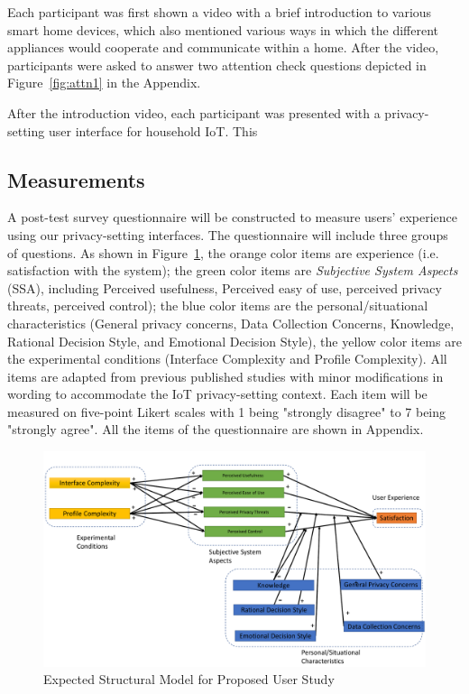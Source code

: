 Each participant was first shown a video with a brief introduction to various smart home devices, which also mentioned various ways in which the different appliances would cooperate and communicate within a home. After the video, participants were asked to answer two attention check questions depicted in Figure~\ref{fig:attn1} in the Appendix.

After the introduction video, each participant was presented with a privacy-setting user interface for household IoT. This 


\subsection{Measurements}\label{subsection:measures}
A post-test survey questionnaire will be constructed to measure users' experience using our privacy-setting interfaces. The questionnaire will include three groups of questions. As shown in Figure~\ref{fig:uimodel}, the orange color items are experience (i.e. satisfaction with the system); the green color items are \textit{Subjective System Aspects} (SSA), including Perceived usefulness, Perceived easy of use, perceived privacy threats, perceived control); the blue color items are the personal/situational characteristics (General privacy concerns, Data Collection Concerns, Knowledge, Rational Decision Style, and Emotional Decision Style), the yellow color items are the experimental conditions (Interface Complexity and Profile Complexity). All items are adapted from previous published studies with minor modifications in wording to accommodate the IoT privacy-setting context. Each item will be measured on five-point Likert scales with 1 being "strongly disagree" to 7 being "strongly agree". All the items of the questionnaire are shown in Appendix.
\begin{figure}
	\centering
	\includegraphics[width=\textwidth]{figures/uimodel.pdf}
	\caption{Expected Structural Model for Proposed User Study}
	\label{fig:uimodel}
\end{figure}

